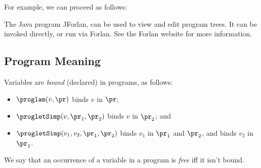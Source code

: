 For example, we can proceed as follows:


The Java program JForlan, can be used to view and edit program trees.
It can be invoked directly, or run via Forlan.  See the Forlan website
for more information.

\subsection{Program Meaning}

Variables are \emph{bound} (declared) in programs, as follows:
\begin{itemize}
\item $\proglam(v, \pr)$ binds $v$ in $\pr$;

\item $\progletSimp(v, \pr_1, \pr_2)$ binds $v$ in $\pr_2$; and

\item $\progletSimp(v_1, v_2, \pr_1, \pr_2)$ binds $v_1$ in $\pr_1$ and
  $\pr_2$, and binds $v_2$ in $\pr_1$.
\end{itemize}
We say that an occurrence of a variable in a program is \emph{free} iff
it isn't bound.

